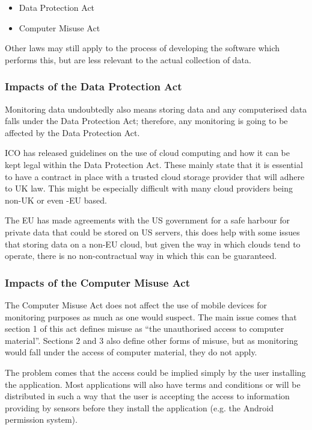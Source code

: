 \documentclass[12pt, a4paper]{article}
\begin{document}
\begin{itemize}
\item Data Protection Act\cite{dpa1998}
\item Computer Misuse Act\cite{cma1990}
\end{itemize}

Other laws may still apply to the process of developing the software which
performs this, but are less relevant to the actual collection of data.


\subsubsection{Impacts of the Data Protection Act}
Monitoring data undoubtedly also means storing data and any computerised data
falls under the Data Protection Act; therefore, any monitoring is going to be
affected by the Data Protection Act.

\gls{ICO} has released guidelines\cite{ico2012cloud} on the use of cloud 
computing and how it can be kept legal within the Data Protection Act. These
mainly state that it is essential to have a contract in place with a trusted
cloud storage provider that will adhere to UK law. This might be especially
difficult with many cloud providers being non-UK or even -EU based.

The EU has made agreements with the US government for a safe harbour for
private data that could be stored on US servers\cite{eu2000safe}, this does
help with some issues that storing data on a non-EU cloud, but given the way in
which clouds tend to operate, there is no non-contractual way in which this can
be guaranteed.

\subsubsection{Impacts of the Computer Misuse Act}
The Computer Misuse Act does not affect the use of mobile devices for monitoring
purposes as much as one would suspect. The main issue comes that section 1 of
this act defines misuse as ``the unauthorised access to computer
material''\cite{cma1990}. Sections 2 and 3 also define other forms of misuse, 
but as monitoring would fall under the access of computer material, they do not
apply.

The problem comes that the access could be implied simply by the user installing
the application. Most applications will also have terms and conditions or will
be distributed in such a way that the user is accepting the access to
information providing by sensors before they install the application (e.g. the
Android permission system).
\end{document}
